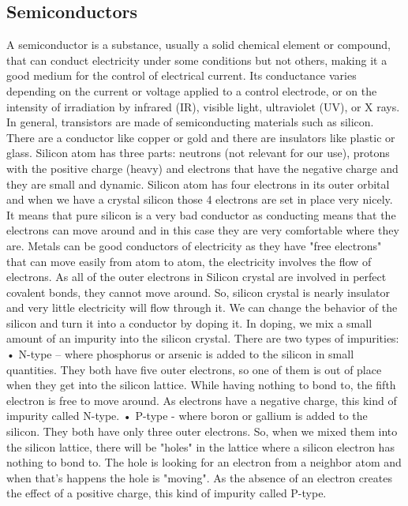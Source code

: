 \subsection{ Semiconductors }
A semiconductor is a substance, usually a solid chemical element or compound, that can conduct electricity under some conditions but not others, making it a good medium for the control of electrical current. Its conductance varies depending on the current or voltage applied to a control electrode, or on the intensity of irradiation by infrared (IR), visible light, ultraviolet (UV), or X rays.
In general, transistors are made of semiconducting materials such as silicon. There are a conductor like copper or gold and there are insulators like plastic or glass. 
Silicon atom has three parts: neutrons (not relevant for our use), protons with the positive charge (heavy) and electrons that have the negative charge and they are small and dynamic. Silicon atom has four electrons in its outer orbital and when we have a crystal silicon those 4 electrons are set in place very nicely. It means that pure silicon is a very bad conductor as  conducting means that the electrons can move around and in this case they are very comfortable where they are.
Metals can be good conductors of electricity as they have "free electrons" that can move easily from atom to atom, the electricity involves the flow of electrons. As all of the outer electrons in Silicon crystal are involved in perfect covalent bonds, they cannot move around. So, silicon crystal is nearly insulator and very little electricity will flow through it.
We can change the behavior of  the silicon and turn it into a conductor by doping it. In doping, we mix a small amount of an impurity into the silicon crystal.
There are two types of impurities:
•	N-type – where phosphorus or arsenic is added to the silicon in small quantities. They both have  five outer electrons, so one of them is out of place when they get into the silicon lattice. While having nothing to bond to, the fifth electron is free to move around. As electrons have a negative charge, this kind of impurity called N-type.
•	P-type - where boron or gallium is added to the silicon. They both have only three outer electrons. So, when we mixed them into the silicon lattice, there will be "holes" in the lattice where a silicon electron has nothing to bond to. The hole is looking for an electron from a neighbor atom and when that’s happens the hole is "moving". As the absence of an electron creates the effect of a positive charge, this kind of impurity called P-type.
